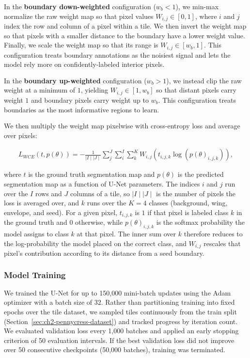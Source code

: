 In the \textbf{boundary down-weighted} configuration ($w_b < 1$), we min-max normalize the raw weight map so that pixel values $W_{i,j} \in [0, 1]$, where $i$ and $j$ index the row and column of a pixel within a tile. We then invert the weight map so that pixels with a smaller distance to the boundary have a lower weight value. Finally, we scale the weight map so that its range is $W_{i,j} \in [w_b, 1]$. This configuration treats boundary annotations as the noisiest signal and lets the model rely more on confidently-labeled interior pixels.

In the \textbf{boundary up-weighted} configuration ($w_b > 1$), we instead clip the raw weight at a minimum of $1$, yielding $W_{i,j} \in [1, w_b]$ so that distant pixels carry weight $1$ and boundary pixels carry weight up to $w_b$. This configuration treats boundaries as the most informative regions to learn.

We then multiply the weight map pixelwise with cross-entropy loss and average over pixels:

\begin{align}\label{eq:ch2-wce}
 L_{WCE}(t, p(\theta)) = - \frac{1}{\mid I \mid \mid J\mid} \sum_{j}^{J} \sum_{i}^{I} \sum_{k}^{K} W_{i,j} (t_{i,j,k} \log(p(\theta)_{i,j,k})),
\end{align}

\noindent where $t$ is the ground truth segmentation map and $p(\theta)$ is the predicted segmentation map as a function of U-Net parameters. The indices $i$ and $j$ run over the $I$ rows and $J$ columns of a tile, so $\mid I \mid \mid J \mid$ is the number of pixels the loss is averaged over, and $k$ runs over the $K = 4$ classes (background, wing, envelope, and seed). For a given pixel, $t_{i,j,k}$ is $1$ if that pixel is labeled class $k$ in the ground truth and $0$ otherwise, while $p(\theta)_{i,j,k}$ is the softmax probability the model assigns to class $k$ at that pixel. The inner sum over $k$ therefore reduces to the log-probability the model placed on the correct class, and $W_{i,j}$ rescales that pixel's contribution according to its distance from a seed boundary.

\subsubsection{Model Training}
We trained the U-Net for up to 150,000 mini-batch updates using the Adam optimizer with a batch size of 32. Rather than partitioning training into fixed epochs over the tile dataset, we sampled tiles continuously from the train split (Section~\ref{sec:ch2-pennycress-dataset}) and tracked progress by iteration count. We evaluated validation loss every 1,000 batches and applied an early stopping criterion of 50 evaluation intervals. If the best validation loss did not improve over 50 consecutive checkpoints (50,000 batches), training was terminated.


